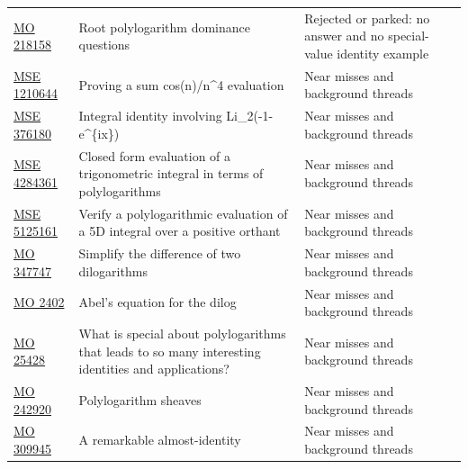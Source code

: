 \begin{longtable}{@{}p{}p{}p{}@{}}
\href{https://mathoverflow.net/questions/218158/root-polylogarithm-dominance-questions}{MO 218158} & Root polylogarithm dominance questions & Rejected or parked: no answer and no special-value identity example\\
\href{https://math.stackexchange.com/questions/1210644/proving-sum-n-1-infty-frac-cosnn4-frac-pi-490-frac-pi-2}{MSE 1210644} & Proving a sum cos(n)/n\textasciicircum{}4 evaluation & Near misses and background threads\\
\href{https://math.stackexchange.com/questions/376180/identity-i-int-0-pi-left-mathrmli-2-left-1-eix-right-mathrmli-2-l}{MSE 376180} & Integral identity involving Li\_2(-1-e\textasciicircum{}\{ix\}) & Near misses and background threads\\
\href{https://math.stackexchange.com/questions/4284361/closed-form-evaluation-of-a-trigonometric-integral-in-terms-of-polylogarithms}{MSE 4284361} & Closed form evaluation of a trigonometric integral in terms of polylogarithms & Near misses and background threads\\
\href{https://math.stackexchange.com/questions/5125161/verify-a-polylogarithmic-evaluation-of-a-5d-integral-over-0-infty5}{MSE 5125161} & Verify a polylogarithmic evaluation of a 5D integral over a positive orthant & Near misses and background threads\\
\href{https://mathoverflow.net/questions/347747/simplify-the-difference-of-two-dilogarithms-as-in-the-logarithmic-counterpart}{MO 347747} & Simplify the difference of two dilogarithms & Near misses and background threads\\
\href{https://mathoverflow.net/questions/2402/abels-equation-for-the-dilog}{MO 2402} & Abel's equation for the dilog & Near misses and background threads\\
\href{https://mathoverflow.net/questions/25428/what-is-special-about-polylogarithms-that-leads-to-so-many-interesting-identitie}{MO 25428} & What is special about polylogarithms that leads to so many interesting identities and applications? & Near misses and background threads\\
\href{https://mathoverflow.net/questions/242920/polylogarithm-sheaves}{MO 242920} & Polylogarithm sheaves & Near misses and background threads\\
\href{https://mathoverflow.net/questions/309945/a-remarkable-almost-identity}{MO 309945} & A remarkable almost-identity & Near misses and background threads\\
\bottomrule
\end{longtable}
\normalsize

